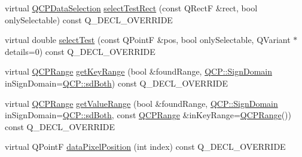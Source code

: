 \begin{DoxyCompactItemize}
\item 
virtual \hyperlink{classQCPDataSelection}{Q\+C\+P\+Data\+Selection} \hyperlink{classQCPBars_ab03bb6125c3e983b89d694f75ce6b3d5}{select\+Test\+Rect} (const Q\+RectF \&rect, bool only\+Selectable) const Q\+\_\+\+D\+E\+C\+L\+\_\+\+O\+V\+E\+R\+R\+I\+DE
\item 
virtual double \hyperlink{classQCPBars_a121f899c27af3186fe93dcd0eb98f49b}{select\+Test} (const Q\+PointF \&pos, bool only\+Selectable, Q\+Variant $\ast$details=0) const Q\+\_\+\+D\+E\+C\+L\+\_\+\+O\+V\+E\+R\+R\+I\+DE
\item 
virtual \hyperlink{classQCPRange}{Q\+C\+P\+Range} \hyperlink{classQCPBars_ac5a3854774d9d9cd129b1eae1426de2d}{get\+Key\+Range} (bool \&found\+Range, \hyperlink{namespaceQCP_afd50e7cf431af385614987d8553ff8a9}{Q\+C\+P\+::\+Sign\+Domain} in\+Sign\+Domain=\hyperlink{namespaceQCP_afd50e7cf431af385614987d8553ff8a9aa38352ef02d51ddfa4399d9551566e24}{Q\+C\+P\+::sd\+Both}) const Q\+\_\+\+D\+E\+C\+L\+\_\+\+O\+V\+E\+R\+R\+I\+DE
\item 
virtual \hyperlink{classQCPRange}{Q\+C\+P\+Range} \hyperlink{classQCPBars_a02cee4bf94d48a1e5f6fc185d9a10477}{get\+Value\+Range} (bool \&found\+Range, \hyperlink{namespaceQCP_afd50e7cf431af385614987d8553ff8a9}{Q\+C\+P\+::\+Sign\+Domain} in\+Sign\+Domain=\hyperlink{namespaceQCP_afd50e7cf431af385614987d8553ff8a9aa38352ef02d51ddfa4399d9551566e24}{Q\+C\+P\+::sd\+Both}, const \hyperlink{classQCPRange}{Q\+C\+P\+Range} \&in\+Key\+Range=\hyperlink{classQCPRange}{Q\+C\+P\+Range}()) const Q\+\_\+\+D\+E\+C\+L\+\_\+\+O\+V\+E\+R\+R\+I\+DE
\item 
virtual Q\+PointF \hyperlink{classQCPBars_a55cdaf565cd3384158d1f7f89533bc2d}{data\+Pixel\+Position} (int index) const Q\+\_\+\+D\+E\+C\+L\+\_\+\+O\+V\+E\+R\+R\+I\+DE
\end{DoxyCompactItemize}
